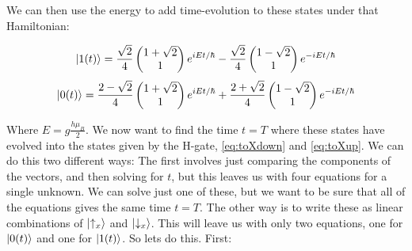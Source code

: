 \documentclass[a4paper,norsk, 10pt]{article}
\begin{document}
We can then use the energy to add time-evolution to these states under that Hamiltonian:

\begin{equation}
\ket{1(t)} = \frac{\sqrt{2}}{4}
\begin{pmatrix}
1 + \sqrt{2} \\ 1
\end{pmatrix}
e^{iEt/\hbar}
-\frac{\sqrt{2}}{4}
\begin{pmatrix}
1 - \sqrt{2} \\ 1
\end{pmatrix}
e^{-iEt/\hbar}
\label{eq:upTime}
\end{equation}
\begin{align}
\ket{0(t)} = \frac{2-\sqrt{2}}{4}
\begin{pmatrix}
1 + \sqrt{2} \\ 1
\end{pmatrix}
e^{iEt/\hbar}
+\frac{2+\sqrt{2}}{4}
\begin{pmatrix}
1 - \sqrt{2} \\ 1
\end{pmatrix}
e^{-iEt/\hbar}
\label{eq:downTime}
\end{align}

Where $E = g\frac{h\mu_B}{2}$. We now want to find the time $t = T$ where these states have evolved into the states given by the H-gate, \eqref{eq:toXdown} and \eqref{eq:toXup}. We can do this two different ways: The first involves just comparing the components of the vectors, and then solving for $t$, but this leaves us with four equations for a single unknown. We can solve just one of these, but we want to be sure that all of the equations gives the same time $t = T$. The other way is to write these as linear combinations of $\ket{\uparrow _x}$ and $\ket{\downarrow _x}$. This will leave us with only two equations, one for $\ket{0(t)}$ and one for $\ket{1(t)}$. So lets do this. First:
\end{document}
